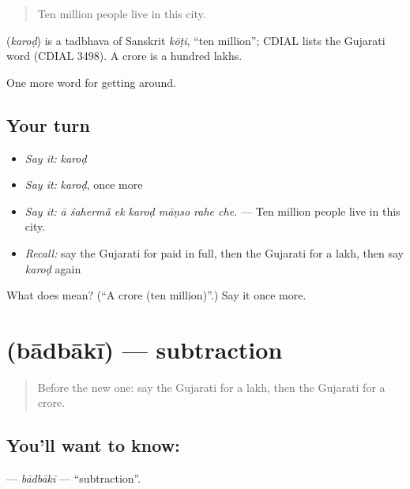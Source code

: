 \begin{quote}
Ten million people live in this city.
\end{quote}

\begin{cousinweb}
\textbf{} (\emph{karoḍ}) is a tadbhava of Sanskrit \emph{kōṭi}, \textquotedblleft{}ten million\textquotedblright{}; CDIAL lists the Gujarati word (CDIAL 3498). A crore is a hundred lakhs.
\end{cousinweb}

\begin{grammarlens}[title={What you've built}]
One more word for getting around.
\end{grammarlens}

\subsection*{Your turn}
\begin{itemize}
\raggedright
  \item \emph{Say it:} \emph{karoḍ}
  \item \emph{Say it:} \emph{karoḍ}, once more
  \item \emph{Say it:} \emph{ā śahermā̃ ek karoḍ māṇso rahe che.} — Ten million people live in this city.
  \item \emph{Recall:} say the Gujarati for paid in full, then the Gujarati for a lakh, then say \emph{karoḍ} again
\end{itemize}

\begin{tcolorbox}[breakable,colback=teal!4,colframe=teal!35!black,title={Before you move on}]
What does  mean? (\textquotedblleft{}A crore (ten million)\textquotedblright{}.) Say it once more.
\end{tcolorbox}
\section[\texorpdfstring{\gu{બાદબાકી} (bādbākī)}{બાદબાકી (bādbākī)}]{ (bādbākī) — subtraction}

\label{lesson:GU-C426-badbaki}



\begin{quote}
Before the new one: say the Gujarati for a lakh, then the Gujarati for a crore.
\end{quote}

\subsection*{You'll want to know: }
\textbf{} — \emph{bādbākī} — \textquotedblleft{}subtraction\textquotedblright{}.


